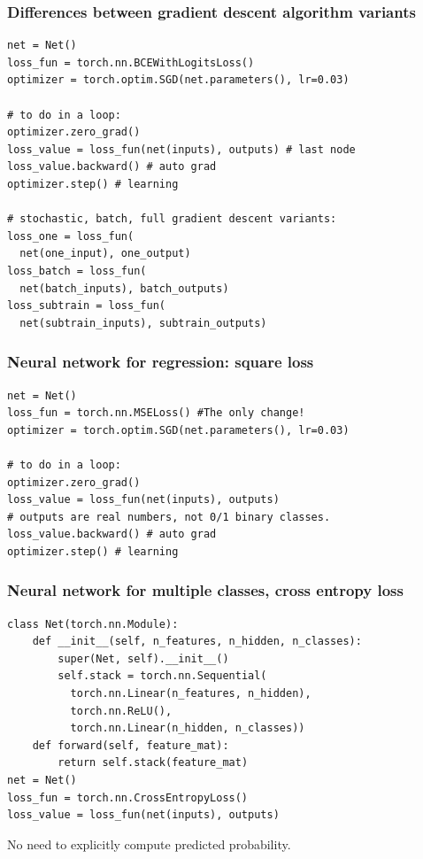 \documentclass{beamer}
\begin{document}
\begin{frame}[fragile]
  \frametitle{Differences between gradient descent algorithm variants}

\begin{verbatim}
net = Net()
loss_fun = torch.nn.BCEWithLogitsLoss()
optimizer = torch.optim.SGD(net.parameters(), lr=0.03)

# to do in a loop:
optimizer.zero_grad()
loss_value = loss_fun(net(inputs), outputs) # last node
loss_value.backward() # auto grad
optimizer.step() # learning

# stochastic, batch, full gradient descent variants:
loss_one = loss_fun(
  net(one_input), one_output)
loss_batch = loss_fun(
  net(batch_inputs), batch_outputs)
loss_subtrain = loss_fun(
  net(subtrain_inputs), subtrain_outputs)
\end{verbatim}

\end{frame}


\begin{frame}[fragile]
  \frametitle{Neural network for regression: square loss}

\begin{verbatim}
net = Net()
loss_fun = torch.nn.MSELoss() #The only change!
optimizer = torch.optim.SGD(net.parameters(), lr=0.03)

# to do in a loop:
optimizer.zero_grad()
loss_value = loss_fun(net(inputs), outputs) 
# outputs are real numbers, not 0/1 binary classes.
loss_value.backward() # auto grad
optimizer.step() # learning
\end{verbatim}

\end{frame}

\begin{frame}[fragile]
  \frametitle{Neural network for multiple classes, cross entropy loss}
\begin{verbatim}
class Net(torch.nn.Module):
    def __init__(self, n_features, n_hidden, n_classes):
        super(Net, self).__init__()
        self.stack = torch.nn.Sequential(
          torch.nn.Linear(n_features, n_hidden),
          torch.nn.ReLU(),
          torch.nn.Linear(n_hidden, n_classes))
    def forward(self, feature_mat):
        return self.stack(feature_mat)
net = Net()
loss_fun = torch.nn.CrossEntropyLoss()
loss_value = loss_fun(net(inputs), outputs)
\end{verbatim}
  No need to explicitly compute predicted probability.
\end{frame}
\end{document}
